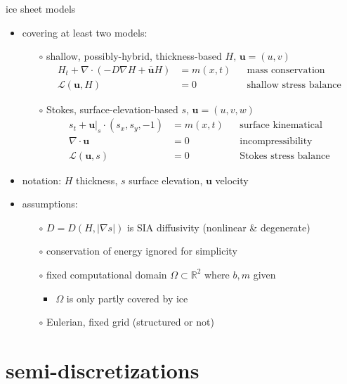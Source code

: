 \documentclass[hide notes,intlimits,usenames,dvipsnames]{beamer}
\newcommand{\RR}{\mathbb{R}}
\newcommand{\Div}{\nabla\cdot}
\newcommand{\grad}{\nabla}
\renewcommand{\bar}{\overline}
\begin{document}
\begin{frame}{ice sheet models}

\begin{itemize}
\item covering at least two models:
    \begin{itemize}
    \item[$\circ$] shallow, possibly-hybrid, thickness-based \hfill {\scriptsize\color{Gray} $H,\, \mathbf{u}=(u,v)$}
        \begin{align*}
        H_t + \Div (-D \grad H + \bar{\mathbf{u}} H) &= m(x,t) && \text{mass conservation} \\
        \mathcal{L}(\mathbf{u},H) &= 0      && \text{shallow stress balance}
        \end{align*}
    \item[$\circ$] Stokes, surface-elevation-based \hfill {\scriptsize\color{Gray} $s,\, \mathbf{u}=(u,v,w)$}
        \begin{align*}
        s_t + \mathbf{u}\big|_s \cdot (s_x,s_y,-1) &= m(x,t) && \text{surface kinematical} \\
        \Div \mathbf{u} &= 0            && \text{incompressibility} \\
        \mathcal{L}(\mathbf{u},s) &= 0  && \text{Stokes stress balance}
        \end{align*}
    \end{itemize}
\item notation: $H$ thickness, $s$ surface elevation, $\mathbf{u}$ velocity
\item assumptions:
    \begin{itemize}
    \item[$\circ$] $D=D(H,|\grad s|)$ is SIA diffusivity (nonlinear \& degenerate)
    \item[$\circ$] conservation of energy ignored for simplicity
    \item[$\circ$] fixed computational domain $\Omega\subset \RR^2$ where $b,m$ given
        \begin{itemize}
        \item $\Omega$ is only partly covered by ice
        \end{itemize}
    \item[$\circ$] Eulerian, fixed grid (structured or not)
    \end{itemize}
\end{itemize}
\end{frame}


\section{semi-discretizations}
\end{document}
